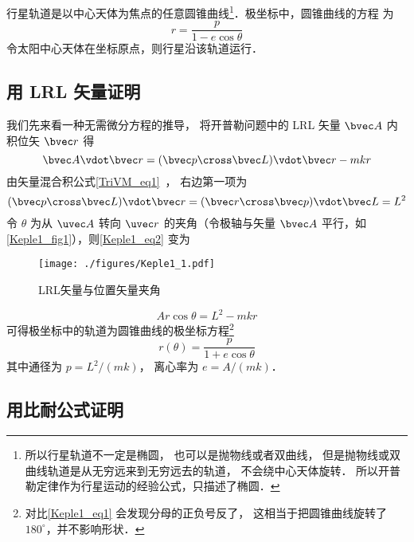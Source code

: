 

行星轨道是以中心天体为焦点的任意圆锥曲线\footnote{所以行星轨道不一定是椭圆， 也可以是抛物线或者双曲线， 但是抛物线或双曲线轨道是从无穷远来到无穷远去的轨道， 不会绕中心天体旋转． 所以开普勒定律作为行星运动的经验公式，只描述了椭圆．}．极坐标中，圆锥曲线的方程
为
\begin{equation}\label{Keple1_eq1}
r = \frac{p}{1 - e \cos \theta }
\end{equation}
令太阳中心天体在坐标原点，则行星沿该轨道运行．

\subsection{用 LRL 矢量证明}

我们先来看一种无需微分方程的推导， 将开普勒问题中的 LRL 矢量 $\bvec A$ 内积位矢 $\bvec r$ 得
\begin{equation}\label{Keple1_eq2}
\bvec A \vdot \bvec r = (\bvec p \cross \bvec L)\vdot \bvec r - mkr
\end{equation}
由矢量混合积公式\autoref{TriVM_eq1}~， 右边第一项为
\begin{equation}
(\bvec p \cross \bvec L)\vdot \bvec r = (\bvec r \cross \bvec p)\vdot \bvec L = L^2
\end{equation}
令 $\theta$ 为从 $\uvec A$ 转向 $\uvec r$ 的夹角（令极轴与矢量 $\bvec A$ 平行，如\autoref{Keple1_fig1}），则\autoref{Keple1_eq2} 变为
\begin{figure}[ht]
\centering
\texttt{[image: ./figures/Keple1\_1.pdf]}
\caption{LRL矢量与位置矢量夹角} \label{Keple1_fig1}
\end{figure}
\begin{equation}
Ar\cos\theta = L^2 - mkr
\end{equation}
可得极坐标中的轨道为圆锥曲线的极坐标方程\footnote{对比\autoref{Keple1_eq1} 会发现分母的正负号反了， 这相当于把圆锥曲线旋转了 $180^\circ$，并不影响形状．}
\begin{equation}
r(\theta) = \frac{p}{1 + e\cos\theta}
\end{equation}
其中通径为 $p = L^2/(mk)$， 离心率为 $e = A/(mk)$．

\subsection{用比耐公式证明}

